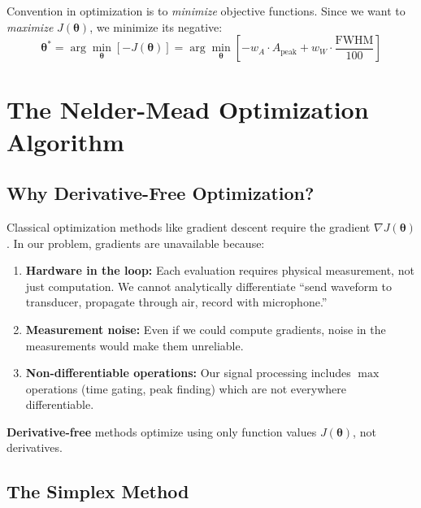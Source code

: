 \documentclass[11pt]{article}
\begin{document}
Convention in optimization is to \textit{minimize} objective functions. Since we want to \textit{maximize} $J(\boldsymbol{\theta})$, we minimize its negative:
\begin{equation}
    \boldsymbol{\theta}^* = \arg\min_{\boldsymbol{\theta}} \left[ -J(\boldsymbol{\theta}) \right] = \arg\min_{\boldsymbol{\theta}} \left[ -w_A \cdot A_{\text{peak}} + w_W \cdot \frac{\text{FWHM}}{100} \right]
\end{equation}

\section{The Nelder-Mead Optimization Algorithm}

\subsection{Why Derivative-Free Optimization?}

Classical optimization methods like gradient descent require the gradient $\nabla J(\boldsymbol{\theta})$. In our problem, gradients are unavailable because:

\begin{enumerate}
    \item \textbf{Hardware in the loop:} Each evaluation requires physical measurement, not just computation. We cannot analytically differentiate ``send waveform to transducer, propagate through air, record with microphone.''

    \item \textbf{Measurement noise:} Even if we could compute gradients, noise in the measurements would make them unreliable.

    \item \textbf{Non-differentiable operations:} Our signal processing includes $\max$ operations (time gating, peak finding) which are not everywhere differentiable.
\end{enumerate}

\textbf{Derivative-free} methods optimize using only function values $J(\boldsymbol{\theta})$, not derivatives.

\subsection{The Simplex Method}
\end{document}
